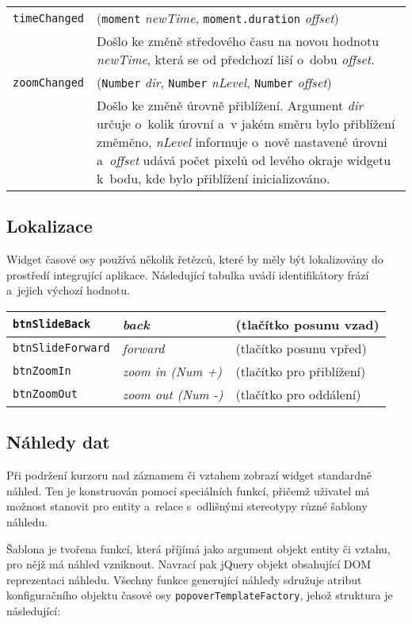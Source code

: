 {\begin{longtable}{|p{}p{}|}
		\hline
		{\tt timeChanged} & ({\tt moment} \emph{newTime}, {\tt moment.duration} \emph{offset})\\
		& Došlo ke změně středového času na novou hodnotu \emph{newTime}, která se od předchozí liší o~dobu \emph{offset}. \\
		\hline
		{\tt zoomChanged} & ({\tt Number} \emph{dir}, {\tt Number} \emph{nLevel}, {\tt Number} \emph{offset})\\
		& Došlo ke změně úrovně přiblížení. Argument \emph{dir} určuje o~kolik úrovní a~v jakém směru bylo přiblížení změměno, \emph{nLevel} informuje o~nově nastavené úrovni a~\emph{offset} udává počet pixelů od levého okraje widgetu k~bodu, kde bylo přiblížení inicializováno. \\
		\hline
	\end{longtable}
	
	\subsection*{Lokalizace}
	Widget časové osy používá několik řetězců, které by měly být lokalizovány do prostředí integrující aplikace. Následující tabulka uvádí identifikátory frází a~jejich výchozí hodnotu.
	\begin{longtable}{|p{}p{}p{}|}
		\hline
		{\tt btnSlideBack} & \emph{back} & (tlačítko posunu vzad)\\
		\hline
		{\tt btnSlideForward} & \emph{forward} & (tlačítko posunu vpřed)\\
		\hline
		{\tt btnZoomIn} & \emph{zoom in (Num +)} & (tlačítko pro přiblížení)\\
		\hline
		{\tt btnZoomOut} & \emph{zoom out (Num -)} & (tlačítko pro oddálení)\\
		\hline
	\end{longtable}
	
	\subsection*{Náhledy dat}
	Při podržení kurzoru nad záznamem či vztahem zobrazí widget standardně náhled. Ten je konstruován pomocí speciálních funkcí, přičemž uživatel má možnost stanovit pro entity a~relace s~odlišnými stereotypy různé šablony náhledu.
	
	Šablona je tvořena funkcí, která příjímá jako argument objekt entity či vztahu, pro nějž má náhled vzniknout. Navrací pak {\sf jQuery} objekt obsahující DOM reprezentaci náhledu. Všechny funkce generující náhledy sdružuje atribut konfiguračního objektu časové osy {\tt popoverTemplateFactory}, jehož struktura je následující:

}
